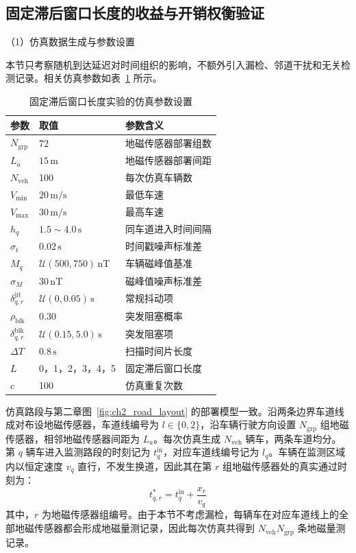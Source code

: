 \documentclass{xdupgthesis}
\begin{document}
\subsection{固定滞后窗口长度的收益与开销权衡验证}

\noindent （1）仿真数据生成与参数设置

本节只考察随机到达延迟对时间组织的影响，不额外引入漏检、邻道干扰和无关检测记录。相关仿真参数如表~\ref{tab:ch3_lag_window_sim} 所示。

\begin{table}[H]
	\centering
	\caption{固定滞后窗口长度实验的仿真参数设置}
	\label{tab:ch3_lag_window_sim}
	\small
	\begin{tabular}{p{2.8cm}p{3.0cm}p{6.0cm}}
		\toprule
		参数 & 取值 & 参数含义 \\
		\midrule
		$N_{\mathrm{grp}}$ & 72 & 地磁传感器部署组数 \\
		$L_a$ & $15\,\mathrm{m}$ & 地磁传感器部署间距 \\
		$N_{\mathrm{veh}}$ & 100 & 每次仿真车辆数 \\
		$V_{\min}$ & $20\,\mathrm{m/s}$ & 最低车速 \\
		$V_{\max}$ & $30\,\mathrm{m/s}$ & 最高车速 \\
		$h_q$ & $1.5\sim4.0\,\mathrm{s}$ & 同车道进入时间间隔 \\
		$\sigma_t$ & $0.02\,\mathrm{s}$ & 时间戳噪声标准差 \\
		$M_q$ & $\mathcal U(500,750)\,\mathrm{nT}$ & 车辆磁峰值基准 \\
		$\sigma_M$ & $30\,\mathrm{nT}$ & 磁峰值噪声标准差 \\
		$\delta_{q,r}^{\mathrm{jit}}$ & $\mathcal U(0,0.05)\,\mathrm{s}$ & 常规抖动项 \\
		$\rho_{\mathrm{blk}}$ & 0.30 & 突发阻塞概率 \\
		$\delta_{q,r}^{\mathrm{blk}}$ & $\mathcal U(0.15,5.0)\,\mathrm{s}$ & 突发阻塞项 \\
		$\Delta T$ & $0.8\,\mathrm{s}$ & 扫描时间片长度 \\
		$L$ & 0，1，2，3，4，5 & 固定滞后窗口长度 \\
		$c$ & 100 & 仿真重复次数 \\
		\bottomrule
	\end{tabular}
\end{table}

仿真路段与第二章图~\ref{fig:ch2_road_layout} 的部署模型一致。沿两条边界车道线成对布设地磁传感器，车道线编号为 $l\in\{0,2\}$，沿车辆行驶方向设置 $N_{\mathrm{grp}}$ 组地磁传感器，相邻地磁传感器间距为 $L_a$。每次仿真生成 $N_{\mathrm{veh}}$ 辆车，两条车道均分。第 $q$ 辆车进入监测路段的时刻记为 $t_q^{\mathrm{in}}$，对应车道线编号记为 $l_q$。车辆在监测区域内以恒定速度 $v_q$ 直行，不发生换道，因此其在第 $r$ 组地磁传感器处的真实通过时刻为：
\begin{equation}
	t_{q,r}^{\ast}
	=
	t_q^{\mathrm{in}}+\frac{x_r}{v_q}
\end{equation}
其中，$r$ 为地磁传感器组编号。由于本节不考虑漏检，每辆车在对应车道线上的全部地磁传感器都会形成地磁量测记录，因此每次仿真共得到 $N_{\mathrm{veh}}N_{\mathrm{grp}}$ 条地磁量测记录。
\end{document}
